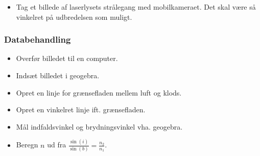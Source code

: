\documentclass[a4paper, 12pt]{article}
\begin{document}
\begin{itemize}
\item Tag et billede af laserlysets strålegang med mobilkameraet. Det skal være så vinkelret på udbredelsen som muligt.
\end{itemize}

\subsubsection*{Databehandling}
\label{sec:org5ca686a}
\begin{itemize}
\item Overfør billedet til en computer.
\item Indsæt billedet i geogebra.
\item Opret en linje for grænsefladen mellem luft og klods.
\item Opret en vinkelret linje ift. grænsefladen.
\item Mål indfaldsvinkel og brydningsvinkel vha. geogebra.
\item Beregn \(n\) ud fra \(\frac{\sin(i)}{\sin(b)}=\frac{n_2}{n_1}\).
\end{itemize}

\newpage
\end{document}
